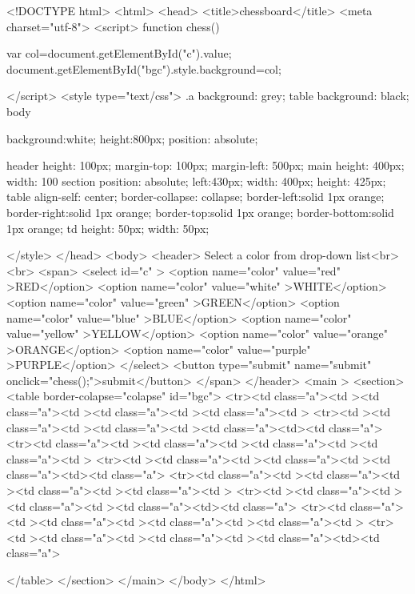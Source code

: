 <!DOCTYPE html>
<html>
<head>
	<title>chessboard</title>
	<meta charset="utf-8">
	<script>
		function chess()
		{
			var col=document.getElementById("c").value;
			document.getElementById("bgc").style.background=col;
			
			
		}
	</script>
	<style type="text/css">
	.a{
				background: grey;
			}
	table{
			background: black;
			}
	body{
		background:white;
		height:800px;
		position: absolute;

	}
	header{
		height: 100px;
		margin-top: 100px;
		margin-left: 500px;
	}
	main{
		height: 400px;
		width: 100%
	}
	section	{
			position: absolute;
			left:430px;
			width: 400px;
			height: 425px;
		}
	table{
		align-self: center;
		border-collapse: collapse;
		border-left:solid 1px orange; 
		border-right:solid 1px orange; 
		border-top:solid 1px orange;
		border-bottom:solid 1px orange; 
	}
	td{
		height: 50px;
		width: 50px;	
	}
		
	</style>
</head>
<body>
	<header>
		Select a color from drop-down list<br><br>
		<span>
		  <select id="c" >
          		<option name="color" value="red" >RED</option>
          		<option  name="color" value="white" >WHITE</option>
          		<option  name="color" value="green" >GREEN</option>
          		<option  name="color" value="blue" >BLUE</option>
          		<option  name="color" value="yellow" >YELLOW</option>
          		<option  name="color" value="orange" >ORANGE</option>
          		<option  name="color" value="purple" >PURPLE</option>
          </select>
          <button type="submit" name="submit" onclick="chess();">submit</button>
      </span>
	</header>
	<main >
		<section>
			<table  border-colapse="colapse" id="bgc">
				<tr><td class="a"><td ><td class="a"><td ><td class="a"><td ><td class="a"><td >
				<tr><td ><td class="a"><td ><td class="a"><td ><td class="a"><td><td class="a">
				<tr><td class="a"><td ><td class="a"><td ><td class="a"><td ><td class="a"><td >
				<tr><td ><td class="a"><td ><td class="a"><td ><td class="a"><td><td class="a">
				<tr><td class="a"><td ><td class="a"><td ><td class="a"><td ><td class="a"><td >
				<tr><td ><td class="a"><td ><td class="a"><td ><td class="a"><td><td class="a">
				<tr><td class="a"><td ><td class="a"><td ><td class="a"><td ><td class="a"><td >
				<tr><td ><td class="a"><td ><td class="a"><td ><td class="a"><td><td class="a">

			</table>
		</section>
	</main>
</body>
</html>